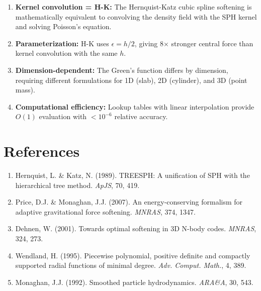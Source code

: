 \documentclass[12pt]{article}
\begin{document}
\begin{enumerate}
\item \textbf{Kernel convolution = H-K:} The Hernquist-Katz cubic spline softening
      is mathematically equivalent to convolving the density field with the
      SPH kernel and solving Poisson's equation.

\item \textbf{Parameterization:} H-K uses $\epsilon = h/2$, giving 8× stronger
      central force than kernel convolution with the same $h$.

\item \textbf{Dimension-dependent:} The Green's function differs by dimension,
      requiring different formulations for 1D (slab), 2D (cylinder), and 3D (point mass).

\item \textbf{Computational efficiency:} Lookup tables with linear interpolation
      provide $O(1)$ evaluation with $< 10^{-6}$ relative accuracy.
\end{enumerate}

\section*{References}

\begin{enumerate}
\item Hernquist, L. \& Katz, N. (1989). TREESPH: A unification of SPH with the
      hierarchical tree method. \textit{ApJS}, 70, 419.
\item Price, D.J. \& Monaghan, J.J. (2007). An energy-conserving formalism for
      adaptive gravitational force softening. \textit{MNRAS}, 374, 1347.
\item Dehnen, W. (2001). Towards optimal softening in 3D N-body codes.
      \textit{MNRAS}, 324, 273.
\item Wendland, H. (1995). Piecewise polynomial, positive definite and compactly
      supported radial functions of minimal degree. \textit{Adv. Comput. Math.}, 4, 389.
\item Monaghan, J.J. (1992). Smoothed particle hydrodynamics. \textit{ARA\&A}, 30, 543.
\end{enumerate}
\end{document}
